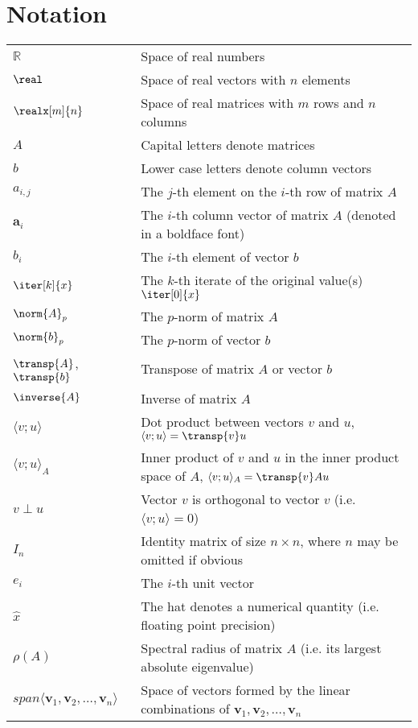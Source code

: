 \section{Notation}
\label{sec:notation}


\begin{tabular}{ll}
  $\mathbb{R}$ & Space of real numbers \\
  $\real$ & Space of real vectors with $n$ elements \\
  $\realx[m]{n}$ & Space of real matrices with $m$ rows and $n$ columns \\
  $A$ & Capital letters denote matrices \\
  $b$ & Lower case letters denote column vectors \\
  $a_{i,j}$ & The $j$-th element on the $i$-th row of matrix $A$ \\
  $\bm{a}_{i}$ & The $i$-th column vector of matrix $A$ (denoted in a boldface font) \\
  $b_{i}$ & The $i$-th element of vector $b$ \\
  $\iter[k]{x}$ & The $k$-th iterate of the original value(s) $\iter[0]{x}$\\
  $\norm{A}_p$ & The $p$-norm of matrix $A$ \\
  $\norm{b}_p$ & The $p$-norm of vector $b$ \\
  $\transp{A}$, $\transp{b}$    & Transpose of matrix $A$ or vector $b$\\
  $\inverse{A}$ & Inverse of matrix $A$ \\
  $\langle v;u \rangle$ & Dot product between vectors $v$ and $u$, $\langle v;u \rangle = \transp{v}u$\\
  $\langle v;u \rangle_A$ & Inner product of $v$ and $u$ in the inner product space of $A$, $\langle v;u \rangle_A = \transp{v}Au$\\
  $v \perp u$ & Vector $v$ is orthogonal to vector $v$ (i.e. $\langle v;u \rangle = 0$) \\
  $I_n$      & Identity matrix of size $n \times n$, where $n$ may be omitted if obvious  \\
  $e_i$      & The $i$-th unit vector \\
  $\hat{x}$ & The hat denotes a numerical quantity (i.e. floating point precision) \\
  $\rho(A)$ & Spectral radius of matrix $A$ (i.e. its largest absolute eigenvalue) \\
  $span\langle \bm{v}_1, \bm{v}_2, \dots, \bm{v}_{n} \rangle$ & Space of vectors formed by the linear combinations of $\bm{v}_1, \bm{v}_2,\dots,\bm{v}_n$ \\

\end{tabular}
